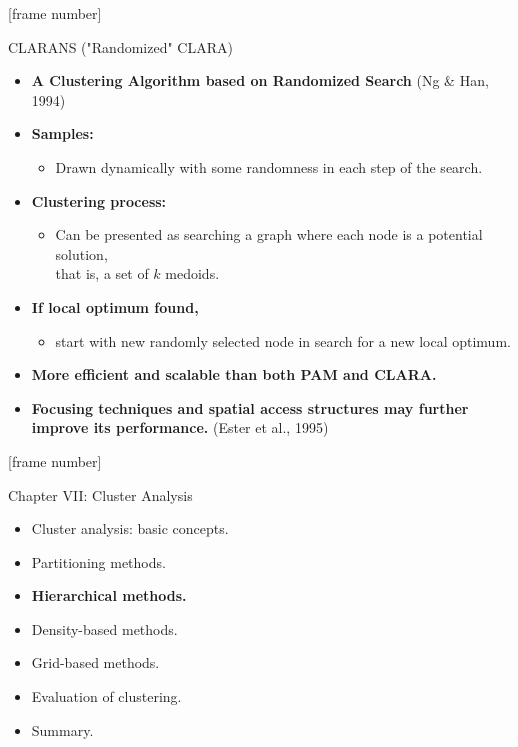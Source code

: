 \documentclass[aspectratio=169,t,xcolor=dvipsnames]{beamer}
\begin{document}
  { %
    [frame number]
    \begin{frame}{CLARANS ("Randomized" CLARA)}
      \begin{itemize}
        \item \textbf{A Clustering Algorithm based on Randomized Search} (Ng \& Han, 1994)
        \item \textbf{Samples:}
        \begin{itemize}
          \item Drawn dynamically with some randomness in each step of the search.
        \end{itemize}
        \item \textbf{Clustering process:}
        \begin{itemize}
          \item Can be presented as searching a graph where each node is a potential solution,\\
          that is, a set of $k$ medoids.
        \end{itemize}
        \item \textbf{If local optimum found,}
        \begin{itemize}
          \item start with new randomly selected node in search for a new local optimum.
        \end{itemize}
        \item \textbf{More efficient and scalable than both PAM and CLARA.}
        \item \textbf{Focusing techniques and spatial access structures may further improve its performance.} (Ester et al., 1995)
      \end{itemize}
    \end{frame}
  }

  {
    [frame number]
    \begin{frame}{Chapter VII: Cluster Analysis}
        \begin{itemize}
            \item Cluster analysis: basic concepts.
            \item Partitioning methods.
            \item \textbf{Hierarchical methods.}
            \item Density-based methods.
            \item Grid-based methods.
            \item Evaluation of clustering.
            \item Summary.
        \end{itemize}
    \end{frame}
  }
\end{document}
